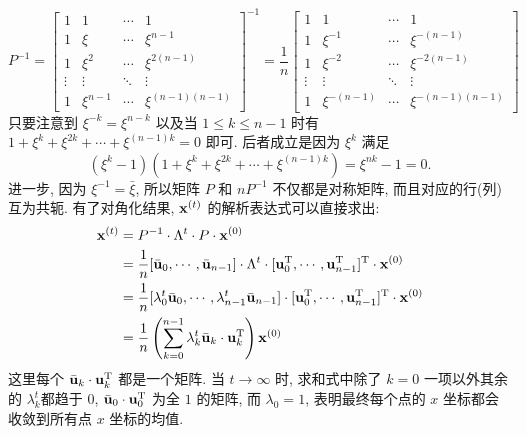 \[P^{-1} = \begin{bmatrix} 1 & 1 & \cdots & 1 \\ 1 & \xi & \cdots & \xi^{n-1} \\ 1 & \xi^2  & \cdots & \xi^{2(n-1)} \\ \vdots & \vdots & \ddots & \vdots \\ 1 & \xi^{n-1} & \cdots & \xi^{(n-1)(n-1)}\end{bmatrix} ^{-1} = \frac{1}{n} \begin{bmatrix} 1 & 1 & \cdots & 1 \\ 1 & \xi^{-1} & \cdots & \xi^{-(n-1)} \\ 1 & \xi^{-2}  & \cdots & \xi^{-2(n-1)} \\ \vdots & \vdots & \ddots & \vdots \\ 1 & \xi^{-(n-1)} & \cdots & \xi^{-(n-1)(n-1)}\end{bmatrix}  \]
只要注意到 $\xi^{-k} = \xi^{n-k}$ 以及当 $1\le k\le n-1$ 时有 $1+\xi^k+\xi^{2k}+\cdots+\xi^{(n-1)k}=0$ 即可. 后者成立是因为 $\xi^k$ 满足 
$$(\xi^k-1)(1+\xi^k+\xi^{2k}+\cdots+\xi^{(n-1)k}) = \xi^{nk}-1 = 0 .$$
进一步, 因为 $\xi^{-1} = \bar{\xi}$, 所以矩阵 $P$ 和 $nP^{-1}$ 不仅都是对称矩阵, 而且对应的行(列)互为共轭.
有了对角化结果, $ \bold{x}^{(t)}$ 的解析表达式可以直接求出: 
\begin{align*} \bold{x}^{(t)} &= P^{-1}\cdot\Lambda^t\cdot P\cdot \bold{x}^{(0)}\\
&=  \frac{1}{n}[\bar{\bold{u}}_0,\cdots,\bar{\bold{u}}_{n-1}] \cdot \Lambda^t\cdot [\bold{u}_0^\mathrm{T},\cdots,\bold{u}_{n-1}^\mathrm{T}]^\mathrm{T}\cdot  \bold{x}^{(0)} \\
&= \frac{1}{n}[\lambda_0^t\bar{\bold{u}}_0,\cdots,\lambda_{n-1}^t\bar{\bold{u}}_{n-1}]\cdot[\bold{u}_0^\mathrm{T},\cdots,\bold{u}_{n-1}^\mathrm{T}]^\mathrm{T} \cdot \bold{x}^{(0)} \\
&= \frac{1}{n}\left(\sum_{k=0}^{n-1}{\lambda_k^t\bar{\bold{u}}_k\cdot\bold{u}_k^\mathrm{T} }\right)\bold{x}^{(0)}
\end{align*}
这里每个 $\bar{\bold{u}}_k\cdot\bold{u}_k^\mathrm{T}$ 都是一个矩阵. 
当 $t\to\infty$ 时, 求和式中除了 $k=0$ 一项以外其余的 $\lambda_k^t$都趋于 $0$, $\bar{\bold{u}}_0\cdot\bold{u}_0^\mathrm{T}$ 为全 $1$ 的矩阵, 而 $\lambda_0=1$, 表明最终每个点的 $x$ 坐标都会收敛到所有点 $x$ 坐标的均值.

